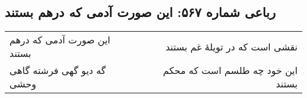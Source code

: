 \begin{center}
\section*{رباعی شماره ۵۶۷: این صورت آدمی که درهم بستند}
\label{sec:0567}
\begin{longtable}{l p{0.5cm} r}
این صورت آدمی که درهم بستند
&&
نقشی است که در تویلهٔ غم بستند
\\
گه دیو گهی فرشته گاهی وحشی
&&
این خود چه طلسم است که محکم بستند
\\
\end{longtable}
\end{center}
